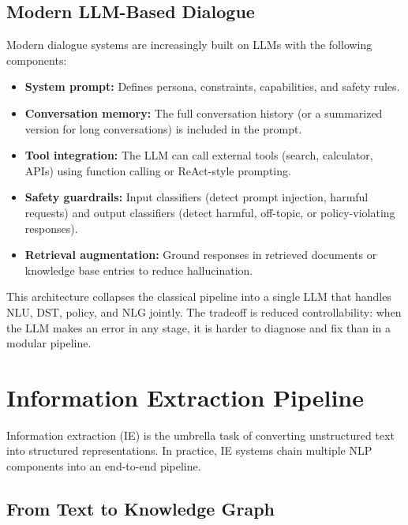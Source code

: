 \subsection{Modern LLM-Based Dialogue}

Modern dialogue systems are increasingly built on LLMs with the following components:

\begin{itemize}
    \item \textbf{System prompt:} Defines persona, constraints, capabilities, and safety rules.
    \item \textbf{Conversation memory:} The full conversation history (or a summarized version
          for long conversations) is included in the prompt.
    \item \textbf{Tool integration:} The LLM can call external tools (search, calculator,
          APIs) using function calling or ReAct-style prompting.
    \item \textbf{Safety guardrails:} Input classifiers (detect prompt injection, harmful
          requests) and output classifiers (detect harmful, off-topic, or policy-violating
          responses).
    \item \textbf{Retrieval augmentation:} Ground responses in retrieved documents or
          knowledge base entries to reduce hallucination.
\end{itemize}

This architecture collapses the classical pipeline into a single LLM that handles NLU, DST,
policy, and NLG jointly.  The tradeoff is reduced controllability: when the LLM makes an
error in any stage, it is harder to diagnose and fix than in a modular pipeline.

\section{Information Extraction Pipeline}
\label{sec:ie_pipeline}

Information extraction (IE) is the umbrella task of converting unstructured text into
structured representations.  In practice, IE systems chain multiple NLP components into an
end-to-end pipeline.

\subsection{From Text to Knowledge Graph}

